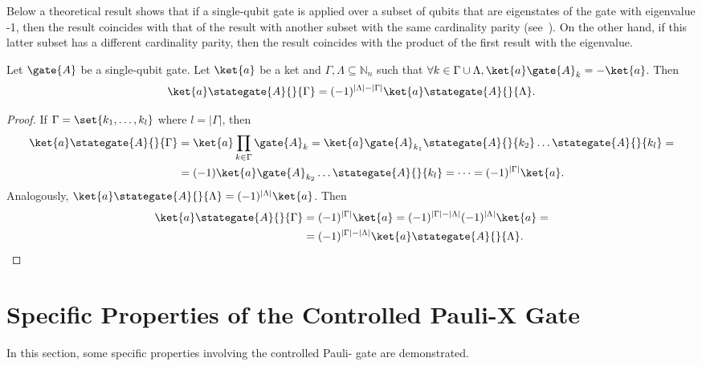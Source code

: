 Below a theoretical result shows that  if a single-qubit gate is applied over a subset of qubits that are eigenstates of the gate  with eigenvalue -1, then the result coincides with that of the result with another subset with the same cardinality parity (see~\cite{Nielsen_Chuang_2010}). On the other hand, if this latter subset has a different cardinality parity, then the result coincides with the product of the first result with the eigenvalue.
\begin{proposition}
    Let $\gate{A}$ be a single-qubit gate. Let $\ket{a}$ be a ket and $\Gamma, \Lambda \subseteq \mathbb{N}_n$ such that $\forall k \in \Gamma \cup \Lambda, \ket{a} \gate{A}_{k} = -\ket{a}$. Then
    \begin{equation}
        \ket{a} \stategate{A}{}{\Gamma} = (-1)^{|\Lambda|-|\Gamma|}\ket{a} \stategate{A}{}{\Lambda}.
    \end{equation}
\end{proposition}
\begin{proof}
    If $\Gamma=\set{k_1,\dots,k_l}$ where $l=|\Gamma|$, then
    \begin{align*}
        \ket{a} \stategate{A}{}{\Gamma} &= \ket{a} \prod_{k \in \Gamma} \gate{A}_k = \ket{a}\gate{A}_{k_1} \stategate{A}{}{k_2}\dots\stategate{A}{}{k_l} =\\
        &= (-1)\ket{a}\gate{A}_{k_2}\dots\stategate{A}{}{k_l} =\dots = (-1)^{|\Gamma|} \ket{a}.
    \end{align*}
    Analogously, $\ket{a} \stategate{A}{}{\Lambda} = (-1)^{|\Lambda|} \ket{a}$.
    Then
    \begin{align*}
        \ket{a} \stategate{A}{}{\Gamma} &= (-1)^{|\Gamma|} \ket{a} = (-1)^{|\Gamma|-|\Lambda|}(-1)^{|\Lambda|} \ket{a}=\\
        &=(-1)^{|\Gamma|-|\Lambda|}\ket{a} \stategate{A}{}{\Lambda}.
    \end{align*}
\end{proof}

\section{Specific Properties of the Controlled Pauli-X Gate}
In this section, some specific properties involving  the controlled Pauli- gate are demonstrated.

